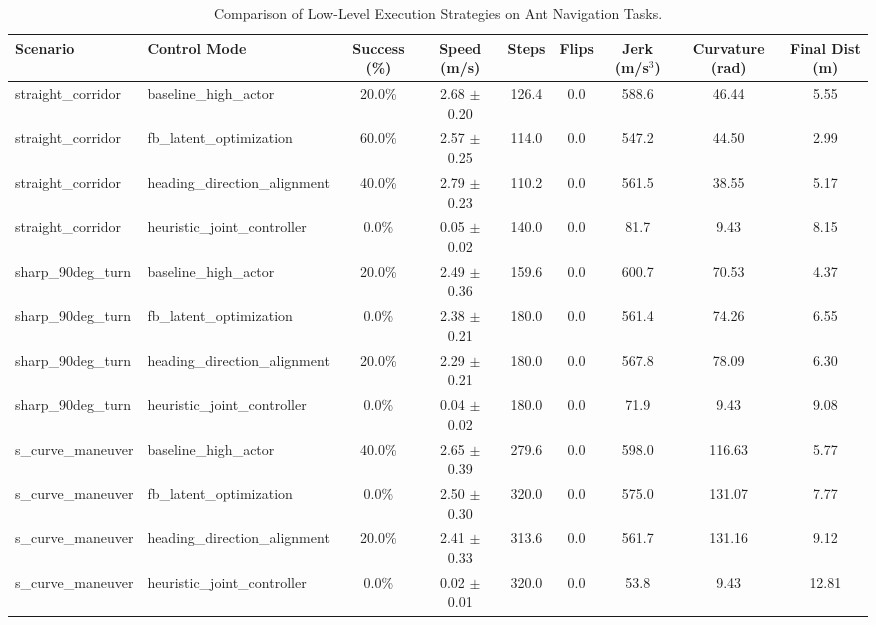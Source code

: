 \begin{table}[t]
\centering\small
\caption{Comparison of Low-Level Execution Strategies on Ant Navigation Tasks.}
\label{tab:lowlevel_comparison}
\begin{tabular}{llccccccc}
\toprule
\textbf{Scenario} & \textbf{Control Mode} & \textbf{Success (\%)} & \textbf{Speed (m/s)} & \textbf{Steps} & \textbf{Flips} & \textbf{Jerk (m/s$^3$)} & \textbf{Curvature (rad)} & \textbf{Final Dist (m)} \\
\midrule
straight\_corridor & baseline\_high\_actor & 20.0\% & 2.68 $\pm$ 0.20 & 126.4 & 0.0 & 588.6 & 46.44 & 5.55 \\
straight\_corridor & fb\_latent\_optimization & 60.0\% & 2.57 $\pm$ 0.25 & 114.0 & 0.0 & 547.2 & 44.50 & 2.99 \\
straight\_corridor & heading\_direction\_alignment & 40.0\% & 2.79 $\pm$ 0.23 & 110.2 & 0.0 & 561.5 & 38.55 & 5.17 \\
straight\_corridor & heuristic\_joint\_controller & 0.0\% & 0.05 $\pm$ 0.02 & 140.0 & 0.0 & 81.7 & 9.43 & 8.15 \\
\midrule
sharp\_90deg\_turn & baseline\_high\_actor & 20.0\% & 2.49 $\pm$ 0.36 & 159.6 & 0.0 & 600.7 & 70.53 & 4.37 \\
sharp\_90deg\_turn & fb\_latent\_optimization & 0.0\% & 2.38 $\pm$ 0.21 & 180.0 & 0.0 & 561.4 & 74.26 & 6.55 \\
sharp\_90deg\_turn & heading\_direction\_alignment & 20.0\% & 2.29 $\pm$ 0.21 & 180.0 & 0.0 & 567.8 & 78.09 & 6.30 \\
sharp\_90deg\_turn & heuristic\_joint\_controller & 0.0\% & 0.04 $\pm$ 0.02 & 180.0 & 0.0 & 71.9 & 9.43 & 9.08 \\
\midrule
s\_curve\_maneuver & baseline\_high\_actor & 40.0\% & 2.65 $\pm$ 0.39 & 279.6 & 0.0 & 598.0 & 116.63 & 5.77 \\
s\_curve\_maneuver & fb\_latent\_optimization & 0.0\% & 2.50 $\pm$ 0.30 & 320.0 & 0.0 & 575.0 & 131.07 & 7.77 \\
s\_curve\_maneuver & heading\_direction\_alignment & 20.0\% & 2.41 $\pm$ 0.33 & 313.6 & 0.0 & 561.7 & 131.16 & 9.12 \\
s\_curve\_maneuver & heuristic\_joint\_controller & 0.0\% & 0.02 $\pm$ 0.01 & 320.0 & 0.0 & 53.8 & 9.43 & 12.81 \\
\bottomrule
\end{tabular}
\end{table}
